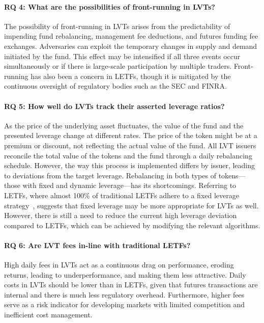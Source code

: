 \paragraph{RQ 4: What are the possibilities of front-running in LVTs?} The possibility of front-running in LVTs arises from the predictability of impending fund rebalancing, management fee deductions, and futures funding fee exchanges. Adversaries can exploit the temporary changes in supply and demand initiated by the fund. This effect may be intensified if all three events occur simultaneously or if there is large-scale participation by multiple traders. Front-running has also been a concern in LETFs, though it is mitigated by the continuous oversight of regulatory bodies such as the SEC and FINRA.
	
\paragraph{RQ 5: How well do LVTs track their asserted leverage ratios?} As the price of the underlying asset fluctuates, the value of the fund and the presented leverage change at different rates. The price of the token might be at a premium or discount, not reflecting the actual value of the fund. All LVT issuers reconcile the total value of the tokens and the fund through a daily rebalancing schedule. However, the way this process is implemented differs by issuer, leading to deviations from the target leverage. Rebalancing in both types of tokens—those with fixed and dynamic leverage—has its shortcomings. Referring to LETFs, where almost 100\% of traditional LETFs adhere to a fixed leverage strategy~\cite{ETFDB}, suggests that fixed leverage may be more appropriate for LVTs as well. However, there is still a need to reduce the current high leverage deviation compared to LETFs, which can be achieved by modifying the relevant algorithms.
	
\paragraph{RQ 6: Are LVT fees in-line with traditional LETFs?} High daily fees in LVTs act as a continuous drag on performance, eroding returns, leading to underperformance, and making them less attractive. Daily costs in LVTs should be lower than in LETFs, given that futures transactions are internal and there is much less regulatory overhead. Furthermore, higher fees serve as a risk indicator for developing markets with limited competition and inefficient cost management.

